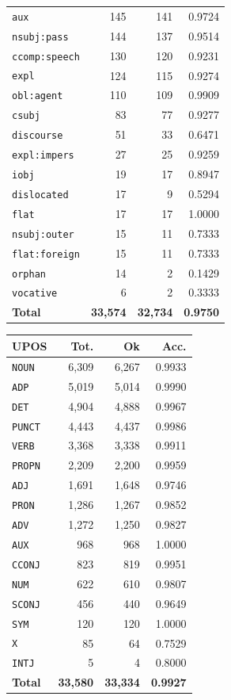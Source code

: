 \begin{table}[ht]
\begin{minipage}[t]{0.55\linewidth}
\begin{tabular}{lrrr}
\texttt{aux} & 145 & 141 & 0.9724 \\
\texttt{nsubj\!:\!pass} & 144 & 137 & 0.9514 \\
\texttt{ccomp\!:\!speech} & 130 & 120 & 0.9231 \\
\texttt{expl} & 124 & 115 & 0.9274 \\
\texttt{obl\!:\!agent} & 110 & 109 & 0.9909 \\
\texttt{csubj} & 83 & 77 & 0.9277 \\
\texttt{discourse} & 51 & 33 & 0.6471 \\
\texttt{expl\!:\!impers} & 27 & 25 & 0.9259 \\
\texttt{iobj} & 19 & 17 & 0.8947 \\
\texttt{dislocated} & 17 & 9 & 0.5294 \\
\texttt{flat} & 17 & 17 & 1.0000 \\
\texttt{nsubj\!:\!outer} & 15 & 11 & 0.7333 \\
\texttt{flat\!:\!foreign} & 15 & 11 & 0.7333 \\
\texttt{orphan} & 14 & 2 & 0.1429 \\
\texttt{vocative} & 6 & 2 & 0.3333 \\
\midrule
\textbf{Total} & \textbf{33,574} & \textbf{32,734} & \textbf{0.9750} \\
\bottomrule
\end{tabular}
\end{minipage}
\hfill
\begin{minipage}[t]{0.42\linewidth}
\centering\scriptsize
\begin{tabular}{lrrr}
\toprule
\textbf{UPOS} & \textbf{Tot.} & \textbf{Ok} & \textbf{Acc.} \\
\midrule
\texttt{NOUN} & 6,309 & 6,267 & 0.9933 \\
\texttt{ADP} & 5,019 & 5,014 & 0.9990 \\
\texttt{DET} & 4,904 & 4,888 & 0.9967 \\
\texttt{PUNCT} & 4,443 & 4,437 & 0.9986 \\
\texttt{VERB} & 3,368 & 3,338 & 0.9911 \\
\texttt{PROPN} & 2,209 & 2,200 & 0.9959 \\
\texttt{ADJ} & 1,691 & 1,648 & 0.9746 \\
\texttt{PRON} & 1,286 & 1,267 & 0.9852 \\
\texttt{ADV} & 1,272 & 1,250 & 0.9827 \\
\texttt{AUX} & 968 & 968 & 1.0000 \\
\texttt{CCONJ} & 823 & 819 & 0.9951 \\
\texttt{NUM} & 622 & 610 & 0.9807 \\
\texttt{SCONJ} & 456 & 440 & 0.9649 \\
\texttt{SYM} & 120 & 120 & 1.0000 \\
\texttt{X} & 85 & 64 & 0.7529 \\
\texttt{INTJ} & 5 & 4 & 0.8000 \\
\midrule
\textbf{Total} & \textbf{33,580} & \textbf{33,334} & \textbf{0.9927} \\
\bottomrule
\end{tabular}
\end{minipage}
\end{table}
